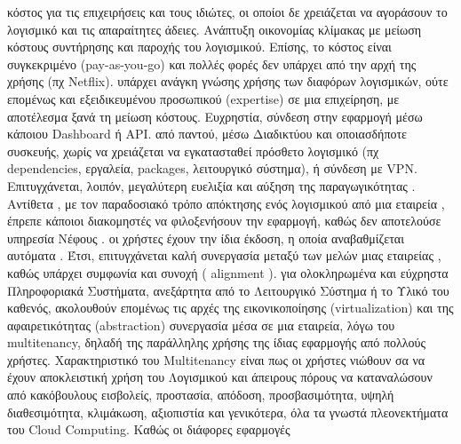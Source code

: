 \documentclass{article}
\begin{document}
\begin{itemize}
     κόστος για τις επιχειρήσεις και τους ιδιώτες, οι
οποίοι δε χρειάζεται να αγοράσουν το λογισμικό και τις απαραίτητες
άδειες. Ανάπτυξη οικονομίας κλίμακας με μείωση κόστους συντήρησης και
παροχής του λογισμικού. Επίσης, το κόστος είναι συγκεκριμένο
(pay-as-you-go) και
πολλές φορές δεν υπάρχει από την αρχή της χρήσης (πχ
Netflix).
     υπάρχει ανάγκη γνώσης χρήσης των διαφόρων λογισμικών, ούτε
επομένως και εξειδικευμένου προσωπικού 
(expertise)  σε μια επιχείρηση, με αποτέλεσμα
ξανά τη μείωση κόστους. Ευχρηστία, σύνδεση στην εφαρμογή μέσω κάποιου
Dashboard ή
API.
     από παντού, μέσω Διαδικτύου και οποιασδήποτε συσκευής,
χωρίς να χρειάζεται να εγκατασταθεί πρόσθετο λογισμικό (πχ
dependencies, εργαλεία,
packages, λειτουργικό σύστημα), ή σύνδεση με
VPN. Επιτυγχάνεται,
λοιπόν, μεγαλύτερη ευελιξία και αύξηση της παραγωγικότητας  . Αντίθετα
, με τον παραδοσιακό τρόπο απόκτησης ενός λογισμικού από μια εταιρεία
, έπρεπε κάποιοι διακομηστές να φιλοξενήσουν την εφαρμογή, καθώς δεν
αποτελούσε υπηρεσία Νέφους .
     οι χρήστες έχουν την ίδια έκδοση, η οποία αναβαθμίζεται
αυτόματα . Έτσι, επιτυγχάνεται καλή συνεργασία μεταξύ των μελών μιας
εταιρείας , καθώς υπάρχει συμφωνία και συνοχή
( alignment ).
     για ολοκληρωμένα και εύχρηστα Πληροφοριακά Συστήματα,
ανεξάρτητα από το Λειτουργικό Σύστημα ή το Υλικό του καθενός,
ακολουθούν επομένως τις αρχές της εικονικοποίησης
(virtualization) και της
αφαιρετικότητας
(abstraction)
     συνεργασία μέσα σε μια εταιρεία, λόγω του
multitenancy, δηλαδή της
παράλληλης χρήσης της ίδιας εφαρμογής από πολλούς χρήστες.
Χαρακτηριστικό του
Multitenancy είναι πως
οι χρήστες νιώθουν σα να έχουν αποκλειστική χρήση του Λογισμικού και
άπειρους πόρους να καταναλώσουν
     από κακόβουλους εισβολείς, προστασία, απόδοση,
προσβασιμότητα, υψηλή διαθεσιμότητα, κλιμάκωση, αξιοπιστία και
γενικότερα, όλα τα γνωστά πλεονεκτήματα του
Cloud Computing. Καθώς οι διάφορες εφαρμογές

\end{itemize}
\end{document}
